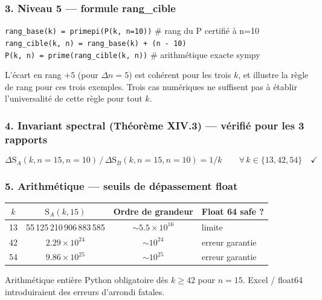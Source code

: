 \documentclass[11pt,a4paper]{article}
\newcommand{\SA}{\mathrm{S}_A}
\newcommand{\SB}{\mathrm{S}_B}
\begin{document}
\subsubsection{3. Niveau 5 --- formule rang\_cible}
\vspace{0.3cm}
\begin{boiteformule}
\texttt{rang\_base(k) = primepi(P(k, n=10))} \quad \# rang du P certifié à n=10\\
\texttt{rang\_cible(k, n) = rang\_base(k) + (n - 10)}\\
\texttt{P(k, n) = prime(rang\_cible(k, n))} \quad \# arithmétique exacte sympy
\end{boiteformule}
L'écart en rang $+5$ (pour $\Delta n = 5$) est cohérent pour les trois $k$,
et illustre la règle de rang pour ces trois exemples. Trois cas numériques ne
suffisent pas à établir l'universalité de cette règle pour tout $k$.

\subsubsection{4. Invariant spectral (Théorème XIV.3) --- vérifié pour les 3 rapports}
\[
\Delta\SA(k, n{=}15, n{=}10)\,/\,\Delta\SB(k, n{=}15, n{=}10) = 1/k
\qquad \forall\, k \in \{13, 42, 54\} \quad \checkmark
\]

\subsubsection{5. Arithmétique --- seuils de dépassement float}

\begin{center}\small
\begin{tabular}{@{}c c c l@{}}
\toprule
\rowcolor{spectralgris}
$k$ & $\SA(k,15)$ & Ordre de grandeur & Float 64 safe ? \\
\midrule
13 & 55\,125\,210\,906\,883\,585 & $\sim 5.5\times 10^{16}$ & limite \\
42 & $2.29\times 10^{24}$ & $\sim 10^{24}$ & erreur garantie \\
54 & $9.86\times 10^{25}$ & $\sim 10^{25}$ & erreur garantie \\
\bottomrule
\end{tabular}
\end{center}

\vspace{0.3cm}
\begin{boitealerte}
Arithmétique entière Python obligatoire dès $k \ge 42$ pour $n = 15$.
Excel / float64 introduiraient des erreurs d'arrondi fatales.
\end{boitealerte}
\end{document}
